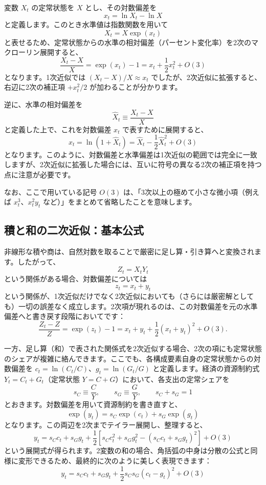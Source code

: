 \documentclass[
  japanese,
  lualatex,
  ja=standard,
  12pt,
  a4paper]{ltjsarticle}
\begin{document}
変数 \(X_t\) の定常状態を \(X\) とし、その対数偏差を \[
x_t=\ln X_t-\ln X
\] と定義します。このとき水準値は指数関数を用いて \[
X_t=X\exp(x_t)
\]
と表せるため、定常状態からの水準の相対偏差（パーセント変化率）を2次のマクローリン展開すると、
\[
\frac{X_t-X}{X}
=
\exp(x_t)-1
=
x_t+\frac{1}{2}x_t^2+O(3)
\] となります。1次近似では \((X_t-X)/X \approx x_t\)
でしたが、2次近似に拡張すると、右辺に2次の補正項 \(+x_t^2/2\)
が加わることが分かります。

逆に、水準の相対偏差を \[
\hat X_t\equiv\frac{X_t-X}{X}
\] と定義した上で、これを対数偏差 \(x_t\) で表すために展開すると、 \[
x_t
=
\ln(1+\hat X_t)
=
\hat X_t-\frac{1}{2}\hat X_t^2+O(3)
\]
となります。このように、対数偏差と水準偏差は1次近似の範囲では完全に一致しますが、2次近似に拡張した場合には、互いに符号の異なる2次の補正項を持つ点に注意が必要です。

なお、ここで用いている記号 \(O(3)\)
は、「3次以上の極めて小さな微小項（例えば \(x_t^3\)、\(x_t^2y_t\)
など）」をまとめて省略したことを意味します。

\subsection{積と和の二次近似：基本公式}\label{ux7a4dux3068ux548cux306eux4e8cux6b21ux8fd1ux4f3cux57faux672cux516cux5f0f}

非線形な積や商は、自然対数を取ることで厳密に足し算・引き算へと変換されます。したがって、
\[
Z_t=X_tY_t
\] という関係がある場合、対数偏差については \[
z_t=x_t+y_t
\]
という関係が、1次近似だけでなく2次近似においても（さらには厳密解としても）一切の誤差なく成立します。2次項が現れるのは、この対数偏差を元の水準偏差へと書き戻す段階においてです：
\[
\frac{Z_t-Z}{Z}
=
\exp(z_t)-1
=
x_t+y_t+\frac{1}{2}(x_t+y_t)^2+O(3).
\]

一方、足し算（和）で表された関係式を2次近似する場合、2次の項にも定常状態のシェアが複雑に絡んできます。ここでも、各構成要素自身の定常状態からの対数偏差を
\(c_t=\ln(C_t/C)\)、\(g_t=\ln(G_t/G)\) と定義します。経済の資源制約式
\(Y_t=C_t+G_t\)（定常状態 \(Y=C+G\)）において、各支出の定常シェアを \[
s_C\equiv\frac{C}{Y},
\qquad
s_G\equiv\frac{G}{Y},
\qquad
s_C+s_G=1
\] とおきます。対数偏差を用いて資源制約を書き直すと、 \[
\exp(y_t)
=
s_C\exp(c_t)+s_G\exp(g_t)
\] となります。この両辺を2次までテイラー展開し、整理すると、 \[
y_t
=
s_Cc_t+s_Gg_t
+\frac{1}{2}
\left[
s_Cc_t^2+s_Gg_t^2
-(s_Cc_t+s_Gg_t)^2
\right]
+O(3)
\]
という展開式が得られます。2変数の和の場合、角括弧の中身は分散の公式と同様に変形できるため、最終的に次のように美しく表現できます：
\[
y_t
=
s_Cc_t+s_Gg_t
+\frac{1}{2}s_Cs_G(c_t-g_t)^2
+O(3)
\]
\end{document}
